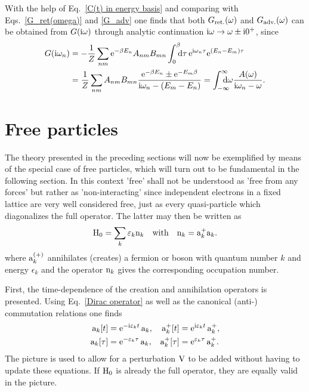 With the help of Eq.~\ref{C(t) in energy basis} and comparing with
Eqs.~\ref{G_ret(omega)} and \ref{G_adv} one finds that both $G \sb{\text{ret.}}
(\omega)$ and $G \sb{\text{adv.}} (\omega)$ can be obtained from $G(\mathrm i \omega)$
through analytic continuation $\mathrm i \omega \rightarrow \omega \pm \mathrm i 0^+$, since
%
\begin{align*}
    G(\I \omega_n) &= -\frac 1 Z \sum_{n m}
    \E^{-\beta E_n} A_{n m} B_{m n}
    \int \from 0 \till \beta \D \tau \,
    \E^{\I \omega_n \tau} \E^{(E_n - E_m) \tau} \\
    &=
    \frac 1 Z \sum_{n m} A_{n m} B_{m n}
    \frac{\E^{-\beta E_n} \pm \E^{-E_m \beta}}{\I \omega_n - (E_m - E_n)}
    = \int \from{-\infty} \till \infty \D \omega
    \frac{A(\omega)}{\I \omega_n - \omega}.
\end{align*}

\section{Free particles}
\label{free particles}

The theory presented in the preceding sections will now be exemplified by means
of the special case of free particles, which will turn out to be fundamental in
the following section. In this context \q'free' shall not be understood as
\q'free from any forces' but rather as \q'non-interacting' since independent
 electrons in a fixed lattice are very well considered free, just as
every quasi-particle which diagonalizes the full  operator. The
latter may then be written as
%
\begin{equation} \label{H_0}
    \mathrm H_0 = \sum_k \varepsilon_k \mathrm n_k
    \quad \text{with} \quad
    \mathrm n_k = \mathrm a_k^+ \mathrm a_k.
\end{equation}
%
where $\mathrm a_k^{(+)}$ annihilates (creates) a fermion or boson with quantum
number $k$ and energy $\epsilon_k$ and the operator $\mathrm n_k$ gives the
corresponding occupation number.

First, the time-dependence of the creation and annihilation operators is
presented. Using Eq.~\ref{Dirac operator} as well as the canonical (anti-)
commutation relations one finds
%
\begin{equation} \label{time-dependent ladder operators}
    \begin{aligned}
        \mathrm a_k[t] &= \mathrm e^{-\mathrm i \varepsilon_k t} \, \mathrm a_k, &
        \mathrm a_k^+[t] &= \mathrm e^{\mathrm i \varepsilon_k t} \, \mathrm a_k^+, \\
        \mathrm a_k[\tau] &= \mathrm e^{-\varepsilon_k \tau} \, \mathrm a_k, &
        \mathrm a_k^+[\tau] &= \mathrm e^{\varepsilon_k \tau} \, \mathrm a_k^+.
    \end{aligned}
\end{equation}
%
The  picture is used to allow for a perturbation $\mathrm V$ to be added
without having to update these equations. If $\mathrm H_0$ is already the full
 operator, they are equally valid in the 
picture.


